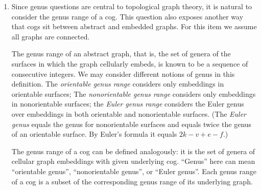 \documentclass{amsart}
\newcommand{\Q}{\mathcal{Q}}
\newcommand{\calM}{\mathcal{M}}
\theoremstyle{definition}
\theoremstyle{remark}
\numberwithin{equation}{section}
\begin{document}
\begin{enumerate}




\item \label{fs.1} Since genus questions are central to topological graph theory, it is natural to consider the genus range of a cog. This question also exposes another way that cogs sit between abstract and embedded graphs. For this item we assume all graphs are connected.

The genus range of an abstract graph, that is, the set of genera of the surfaces in which the graph cellularly embeds, is known to be a  sequence of consecutive integers. 
We may consider different notions of genus in this definition. The \emph{orientable genus range} considers only embeddings in orientable surfaces; The \emph{nonorientable genus range} considers only embeddings in nonorientable surfaces; the \emph{Euler genus range} considers the Euler genus over embeddings in both orientable and nonorientable surfaces. (The \emph{Euler genus} equals the genus for nonorientable surfaces and equals twice the genus of an orientable surface. By Euler's formula it equals $2k-v+e-f$.)  

The genus range of a cog can be defined analogously: it is the set of genera of cellular graph embeddings with given underlying cog.  ``Genus'' here can mean ``orientable genus'', ``nonorientable genus'', or ``Euler genus''.
Each genus range of a cog is a subset of the corresponding genus range of its underlying graph.


\end{enumerate}
\end{document}
